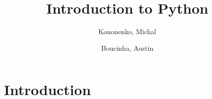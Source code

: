 \documentclass[11pt, twocolumn, twoside]{book}
\author{
    Kononenko, Michal
    \and
    Boucinha, Austin
}
\title{Introduction to Python}
\begin{document}
    \maketitle
    \tableofcontents
    \listoffigures
    \listoftables

\chapter{Introduction}
    
\end{document}
